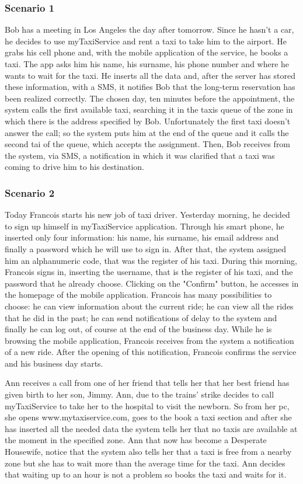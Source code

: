 		\subsubsection{Scenario 1}
		Bob has a meeting in Los Angeles the day after tomorrow. Since he hasn't a car, he decides to use myTaxiService and rent a taxi to take him to the airport. He grabs his cell phone and, with the mobile application of the service, he books a taxi. The app asks him his name, his surname, his phone number and where he wants to wait for the taxi. He inserts all the data and, after the server has stored these information, with a SMS, it notifies Bob that the long-term reservation has been realized correctly. 
		The chosen day, ten minutes before the appointment, the system calls the first available taxi, searching it in the taxis queue of the zone in which there is the address specified by Bob. Unfortunately the first taxi doesn't answer the call; so the system puts him at the end of the queue and it calls the second tai of the queue, which accepts the assignment. Then, Bob receives from the system, via SMS, a notification in which it was clarified that a taxi was coming to drive him to his destination.
		
		\subsubsection{Scenario 2}
		Today Francois starts his new job of taxi driver. Yesterday morning, he decided to sign up himself in myTaxiService application. Through his smart phone, he inserted only four information: his name, his surname, his email address and finally a password which he will use to sign in. After that, the system assigned him an alphanumeric code, that was the register of his taxi.
		During this morning, Francois signs in, inserting the username, that is the register of his taxi, and the password that he already choose. Clicking on the "Confirm" button, he accesses in the homepage of the mobile application. Francois has many possibilities to choose: he can view information about the current ride; he can view all the rides that he did in the past; he can send notifications of delay to the system and finally he can log out, of course at the end of the business day.
		While he is browsing the mobile application, Francois receives from the system a notification of a new ride. After the opening of this notification, Francois confirms the service and his business day starts. 
		
		Ann receives a call from one of her friend that tells her that her best friend has given birth to her son, Jimmy. Ann, due to the trains' strike decides to call myTaxiService to take her to the hospital to visit the newborn. So from her pc, she opens www.mytaxiservice.com, goes to the book a taxi section and after she has inserted all the needed data the system tells her that no taxis are available at the moment in the specified zone. Ann that now has become a Desperate Housewife, notice that the system also tells her that a taxi is free from a nearby zone but she has to wait more than the average time for the taxi. Ann decides that waiting up to an hour is not a problem so books the taxi and waits for it. 
		
